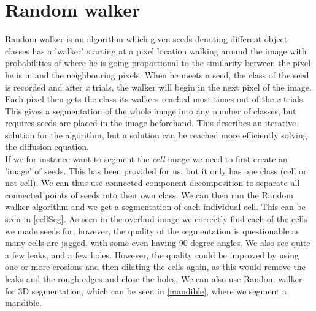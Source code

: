 \section{Random walker}
Random walker is an algorithm which given seeds denoting different object classes has a 'walker' starting at a pixel location walking around the image with probabilities of where he is going proportional to the similarity between the pixel he is in and the neighbouring pixels. When he meets a seed, the class of the seed is recorded and after \textit{x} trials, the walker will begin in the next pixel of the image. Each pixel then gets the class its walkers reached most times out of the \textit{x} trials. This gives a segmentation of the whole image into any number of classes, but requires seeds are placed in the image beforehand. This describes an iterative solution for the algorithm, but a solution can be reached more efficiently solving the diffusion equation.\\
If we for instance want to segment the \textit{cell} image we need to first create an 'image' of seeds. This has been provided for us, but it only has one class (cell or not cell). We can thus use connected component decomposition to separate all connected points of seeds into their own class. We can then run the Random walker algorithm and we get a segmentation of each individual cell. This can be seen in \autoref{cellSeg}. As seen in the overlaid image we correctly find each of the cells we made seeds for, however, the quality of the segmentation is questionable as many cells are jagged, with some even having 90 degree angles. We also see quite a few leaks, and a few holes. However, the quality could be improved by using one or more erosions and then dilating the cells again, as this would remove the leaks and the rough edges and close the holes. We can also use Random walker for 3D segmentation, which can be seen in \autoref{mandible}, where we segment a mandible.

